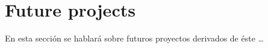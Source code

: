 
\chapter{Future projects}
\label{cha:future}

En esta sección se hablará sobre futuros proyectos derivados de éste \ldots